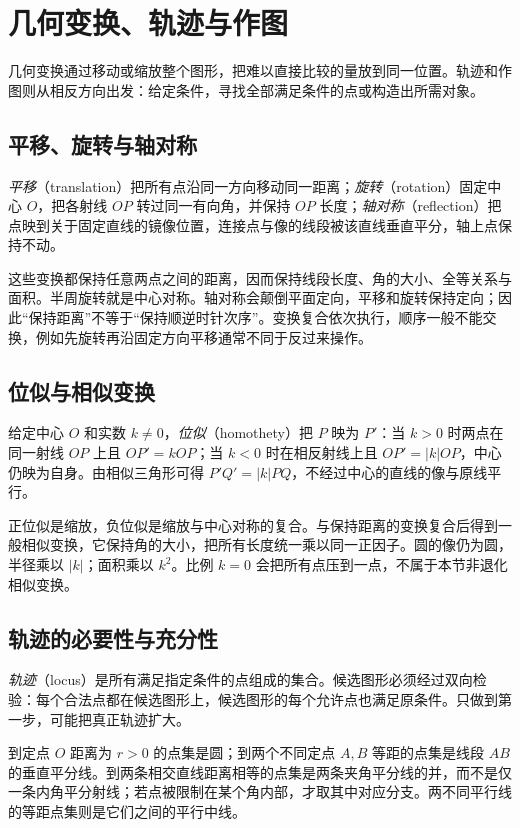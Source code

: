 \setcounter{chapter}{14} %
\chapter{几何变换、轨迹与作图}
\label{chap:em-transformations}
几何变换通过移动或缩放整个图形，把难以直接比较的量放到同一位置。轨迹和作图则从相反方向出发：给定条件，寻找全部满足条件的点或构造出所需对象。

\section{平移、旋转与轴对称}
\emph{平移}（translation）把所有点沿同一方向移动同一距离；\emph{旋转}（rotation）固定中心 $O$，把各射线 $OP$ 转过同一有向角，并保持 $OP$ 长度；\emph{轴对称}（reflection）把点映到关于固定直线的镜像位置，连接点与像的线段被该直线垂直平分，轴上点保持不动。

这些变换都保持任意两点之间的距离，因而保持线段长度、角的大小、全等关系与面积。半周旋转就是中心对称。轴对称会颠倒平面定向，平移和旋转保持定向；因此“保持距离”不等于“保持顺逆时针次序”。变换复合依次执行，顺序一般不能交换，例如先旋转再沿固定方向平移通常不同于反过来操作。

\section{位似与相似变换}
给定中心 $O$ 和实数 $k\ne0$，\emph{位似}（homothety）把 $P$ 映为 $P'$：当 $k>0$ 时两点在同一射线 $OP$ 上且 $OP'=kOP$；当 $k<0$ 时在相反射线上且 $OP'=|k|OP$，中心仍映为自身。由相似三角形可得 $P'Q'=|k|PQ$，不经过中心的直线的像与原线平行。

正位似是缩放，负位似是缩放与中心对称的复合。与保持距离的变换复合后得到一般相似变换，它保持角的大小，把所有长度统一乘以同一正因子。圆的像仍为圆，半径乘以 $|k|$；面积乘以 $k^2$。比例 $k=0$ 会把所有点压到一点，不属于本节非退化相似变换。

\section{轨迹的必要性与充分性}
\emph{轨迹}（locus）是所有满足指定条件的点组成的集合。候选图形必须经过双向检验：每个合法点都在候选图形上，候选图形的每个允许点也满足原条件。只做到第一步，可能把真正轨迹扩大。

到定点 $O$ 距离为 $r>0$ 的点集是圆；到两个不同定点 $A,B$ 等距的点集是线段 $AB$ 的垂直平分线。到两条相交直线距离相等的点集是两条夹角平分线的并，而不是仅一条内角平分射线；若点被限制在某个角内部，才取其中对应分支。两不同平行线的等距点集则是它们之间的平行中线。

